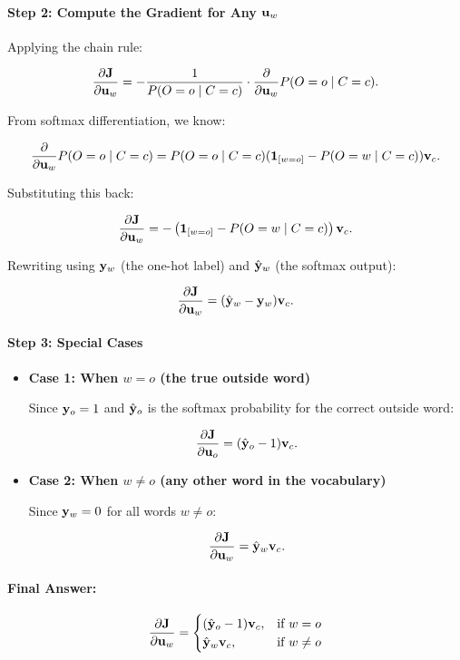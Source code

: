 \begin{parts}
{\paragraph{Step 2: Compute the Gradient for Any $\mathbf{u}_w$}
Applying the chain rule:

\[
\frac{\partial \mathbf{J}}{\partial \mathbf{u}_w} = - \frac{1}{P(O = o \mid C = c)} \cdot \frac{\partial}{\partial \mathbf{u}_w} P(O = o \mid C = c).
\]

From softmax differentiation, we know:

\[
\frac{\partial}{\partial \mathbf{u}_w} P(O = o \mid C = c) =
P(O = o \mid C = c) ( \mathbf{1}_{[w = o]} - P(O = w \mid C = c) ) \mathbf{v}_c.
\]

Substituting this back:

\[
\frac{\partial \mathbf{J}}{\partial \mathbf{u}_w} = - \left( \mathbf{1}_{[w = o]} - P(O = w \mid C = c) \right) \mathbf{v}_c.
\]

Rewriting using $\mathbf{y}_w$ (the one-hot label) and $\hat{\mathbf{y}}_w$ (the softmax output):

\[
\frac{\partial \mathbf{J}}{\partial \mathbf{u}_w} = (\hat{\mathbf{y}}_w - \mathbf{y}_w) \mathbf{v}_c.
\]

\paragraph{Step 3: Special Cases}

\begin{itemize}
    \item \textbf{Case 1: When \( w = o \) (the true outside word)}

    Since \( \mathbf{y}_o = 1 \) and \( \hat{\mathbf{y}}_o \) is the softmax probability for the correct outside word:

    \[
    \frac{\partial \mathbf{J}}{\partial \mathbf{u}_o} = (\hat{\mathbf{y}}_o - 1) \mathbf{v}_c.
    \]

    \item \textbf{Case 2: When \( w \neq o \) (any other word in the vocabulary)}

    Since \( \mathbf{y}_w = 0 \) for all words \( w \neq o \):

    \[
    \frac{\partial \mathbf{J}}{\partial \mathbf{u}_w} = \hat{\mathbf{y}}_w \mathbf{v}_c.
    \]
\end{itemize}

\paragraph{Final Answer:}
\[
\frac{\partial \mathbf{J}}{\partial \mathbf{u}_w} =
\begin{cases}
(\hat{\mathbf{y}}_o - 1) \mathbf{v}_c, & \text{if } w = o \\
\hat{\mathbf{y}}_w \mathbf{v}_c, & \text{if } w \neq o
\end{cases}
\]

}

\end{parts}